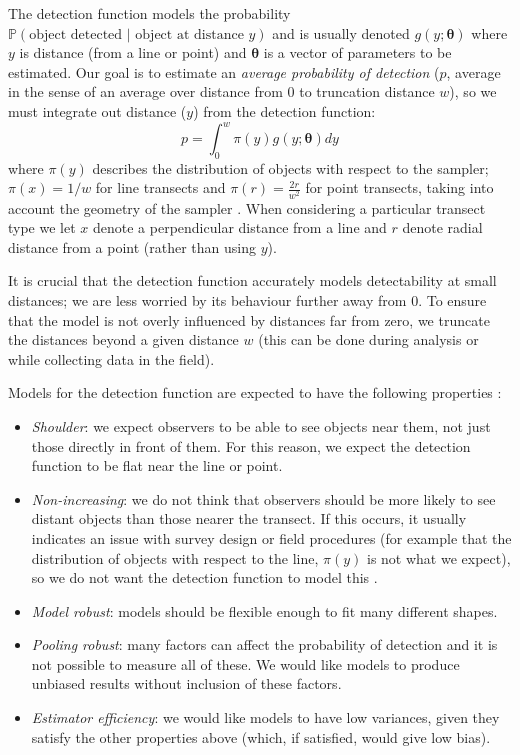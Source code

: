 \documentclass[article,shortnames]{jss}
\providecommand{\tightlist}{%
  \setlength{\itemsep}{0pt}\setlength{\parskip}{0pt}}
\begin{document}
The detection function models the probability
\(\mathbb{P}(\text{object detected } \vert \text{ object at distance } y)\)
and is usually denoted \(g(y; \boldsymbol{\theta})\) where \(y\) is
distance (from a line or point) and \(\boldsymbol{\theta}\) is a vector
of parameters to be estimated. Our goal is to estimate an \emph{average
probability of detection} (\(p\), average in the sense of an average
over distance from \(0\) to truncation distance \(w\)), so we must
integrate out distance (\(y\)) from the detection function: \[
p = \int_0^w \pi(y) g(y; \boldsymbol{\theta}) dy
\] where \(\pi(y)\) describes the distribution of objects with respect
to the sampler; \(\pi(x)=1/w\) for line transects and
\(\pi(r)=\frac{2r}{w^2}\) for point transects, taking into account the
geometry of the sampler \citep[usually referred to as the
\emph{probability density function of distances};][Chapter
3]{Buckland:2001vm}. When considering a particular transect type we let
\(x\) denote a perpendicular distance from a line and \(r\) denote
radial distance from a point (rather than using \(y\)).

It is crucial that the detection function accurately models
detectability at small distances; we are less worried by its behaviour
further away from 0. To ensure that the model is not overly influenced
by distances far from zero, we truncate the distances beyond a given
distance \(w\) (this can be done during analysis or while collecting
data in the field).

Models for the detection function are expected to have the following
properties \citep[Chapter 5]{buckland2015distance}:

\begin{itemize}
\tightlist
\item
  \emph{Shoulder}: we expect observers to be able to see objects near
  them, not just those directly in front of them. For this reason, we
  expect the detection function to be flat near the line or point.
\item
  \emph{Non-increasing}: we do not think that observers should be more
  likely to see distant objects than those nearer the transect. If this
  occurs, it usually indicates an issue with survey design or field
  procedures (for example that the distribution of objects with respect
  to the line, \(\pi(y)\) is not what we expect), so we do not want the
  detection function to model this
  \citep{Marques:2010he, Marques:2012fy, Miller:2015hw}.
\item
  \emph{Model robust}: models should be flexible enough to fit many
  different shapes.
\item
  \emph{Pooling robust}: many factors can affect the probability of
  detection and it is not possible to measure all of these. We would
  like models to produce unbiased results without inclusion of these
  factors.
\item
  \emph{Estimator efficiency}: we would like models to have low
  variances, given they satisfy the other properties above (which, if
  satisfied, would give low bias).
\end{itemize}
\end{document}
